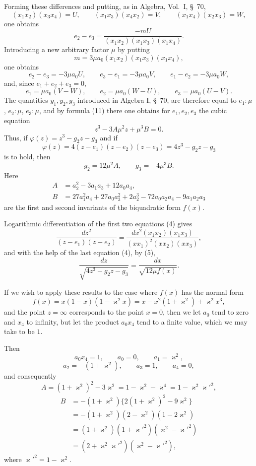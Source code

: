 \documentclass[11pt]{article}
\begin{document}
Forming these differences and putting, as in Algebra, Vol.~I, \S~70,
\[
(x_1x_2)(x_3x_4)=U,\qquad (x_1x_3)(x_4x_2)=V,\qquad (x_1x_4)(x_2x_3)=W,
\]
one obtains
\[
e_2-e_3=\frac{-mU}{(x_1x_2)(x_1x_3)(x_1x_4)}.
\]
Introducing a new arbitrary factor $\mu$ by putting
\begin{equation}
m=3\mu a_0(x_1x_2)(x_1x_3)(x_1x_4),
\tag{5}
\end{equation}
one obtains
\[
e_2-e_3=-3\mu a_0U,
\qquad e_3-e_1=-3\mu a_0V,
\qquad e_1-e_2=-3\mu a_0W,
\]
and, since $e_1+e_2+e_3=0$,
\[
e_1=\mu a_0(V-W),\qquad e_2=\mu a_0(W-U),\qquad e_3=\mu a_0(U-V).
\]
The quantities $y_1,y_2,y_3$ introduced in Algebra I, \S~70, are therefore equal to $e_1:\mu$, $e_2:\mu$, $e_3:\mu$, and by formula (11) there one obtains for $e_1,e_2,e_3$ the cubic equation
\[
z^3-3A\mu^2z+\mu^3B=0.
\]
Thus, if $\varphi(z)=z^3-g_2z-g_3$ and if
\[
\varphi(z)=4(z-e_1)(z-e_2)(z-e_3)=4z^3-g_2z-g_3
\]
is to hold, then
\begin{equation}
g_2=12\mu^2A,\qquad g_3=-4\mu^3B.
\tag{6}
\end{equation}
Here
\begin{equation}
\begin{aligned}
A&=a_2^2-3a_1a_3+12a_0a_4,\\
B&=27a_1^2a_4+27a_0a_3^2+2a_2^3-72a_0a_2a_4-9a_1a_2a_3
\end{aligned}
\tag{7}
\end{equation}
are the first and second invariants of the biquadratic form $f(x)$.

Logarithmic differentiation of the first two equations (4) gives
\[
\frac{dz^2}{(z-e_1)(z-e_2)}=\frac{dx^2(x_1x_2)(x_1x_3)}{(xx_1)^2(xx_2)(xx_3)},
\]
and with the help of the last equation (4), by (5),
\begin{equation}
\frac{dz}{\sqrt{4z^3-g_2z-g_3}}=\frac{dx}{\sqrt{12\mu f(x)}}.
\tag{8}
\end{equation}

If we wish to apply these results to the case where $f(x)$ has the normal form
\[
f(x)=x(1-x)(1-\varkappa^2x)=x-x^2(1+\varkappa^2)+\varkappa^2x^3,
\]
and the point $z=\infty$ corresponds to the point $x=0$, then we let $a_0$ tend to zero and $x_4$ to infinity, but let the product $a_0x_4$ tend to a finite value, which we may take to be $1$.

Then
\[
a_0x_4=1,\qquad a_0=0,\qquad a_1=\varkappa^2,
\]
\[
a_2=-(1+\varkappa^2),\qquad a_3=1,\qquad a_4=0,
\]
and consequently
\[
A=(1+\varkappa^2)^2-3\varkappa^2=1-\varkappa^2-\varkappa^4=1-\varkappa^2\varkappa'^2,
\]
\[
\begin{aligned}
B&=-(1+\varkappa^2)\{2(1+\varkappa^2)^2-9\varkappa^2\}\\
&=-(1+\varkappa^2)(2-\varkappa^2)(1-2\varkappa^2)\\
&=(1+\varkappa^2)(1+\varkappa'^2)(\varkappa^2-\varkappa'^2)\\
&=(2+\varkappa^2\varkappa'^2)(\varkappa^2-\varkappa'^2),
\end{aligned}
\]
where $\varkappa'^2=1-\varkappa^2$.
\end{document}
